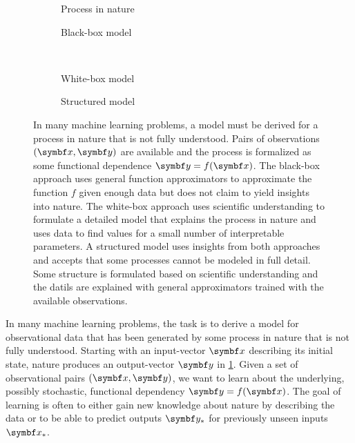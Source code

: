 \begin{figure}[tp]
    \begin{subfigure}[b]{\halffigurewidth}
        \centering
        \caption{
            \label{fig:introduction:models:nature}
            Process in nature
        }
    \end{subfigure}
    \hfill
    \begin{subfigure}[b]{\halffigurewidth}
        \centering
        \caption{
            \label{fig:introduction:models:black_box}
            Black-box model
        }
    \end{subfigure}\\[\figureskip]
    \begin{subfigure}[b]{\halffigurewidth}
        \centering
        \caption{
            \label{fig:introduction:models:white_box}
            White-box model
        }
    \end{subfigure}
    \hfill
    \begin{subfigure}[b]{\halffigurewidth}
        \centering
        \caption{
            \label{fig:introduction:models:structured}
            Structured model
        }
    \end{subfigure}
    \caption[Comparison of model cultures]{
        \label{fig:introduction:models}
        In many machine learning problems, a model must be derived for a process in nature that is not fully understood.
        Pairs of observations $(\mat{x}, \mat{y})$ are available and the process is formalized as some functional dependence $\mat{y} = f(\mat{x})$.
        The black-box approach uses general function approximators to approximate the function $f$ given enough data but does not claim to yield insights into nature.
        The white-box approach uses scientific understanding to formulate a detailed model that explains the process in nature and uses data to find values for a small number of interpretable parameters.
        A structured model uses insights from both approaches and accepts that some processes cannot be modeled in full detail.
        Some structure is formulated based on scientific understanding and the datils are explained with general approximators trained with the available observations.
    }
\end{figure}
In many machine learning problems, the task is to derive a model for observational data that has been generated by some process in nature that is not fully understood.
Starting with an input-vector $\mat{x}$ describing its initial state, nature produces an output-vector $\mat{y}$ in \cref{fig:introduction:models:nature}.
Given a set of observational pairs $(\mat{x}, \mat{y})$, we want to learn about the underlying, possibly stochastic, functional dependency $\mat{y} = f(\mat{x})$.
The goal of learning is often to either gain new knowledge about nature by describing the data or to be able to predict outputs $\mat{y}_\ast$ for previously unseen inputs $\mat{x}_\ast$.

